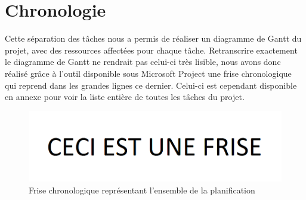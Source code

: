\section{Chronologie}
\label{sec:chronologie}

	Cette séparation des tâches nous a permis de réaliser un diagramme de Gantt du projet, avec des ressources affectées pour chaque tâche. Retranscrire exactement le diagramme de Gantt ne rendrait pas celui-ci très lisible, nous avons donc réalisé grâce à l'outil disponible sous Microsoft Project une frise chronologique qui reprend dans les grandes lignes ce dernier. Celui-ci est cependant disponible en annexe pour voir la liste entière de toutes les tâches du projet.

	\begin{figure}[H]
        \centering
        \includegraphics[width=1.3\textwidth, angle=90]{figure/frise.png}
            \caption{Frise chronologique représentant l'ensemble de la planification}
            \label{fig:frise}
    \end{figure}